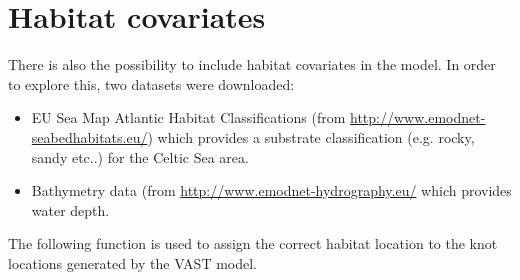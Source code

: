\documentclass[12pt]{article}\usepackage[]{graphicx}\usepackage[]{color}
\begin{document}
\section{Habitat covariates}

There is also the possibility to include habitat covariates in the model. In
order to explore this, two datasets were downloaded:

\begin{itemize}
	\item EU Sea Map Atlantic Habitat Classifications (from
		\url{http://www.emodnet-seabedhabitats.eu/}) which provides a
		substrate classification (e.g. rocky, sandy etc..) for the
		Celtic Sea area.
	\item Bathymetry data (from \url{http://www.emodnet-hydrography.eu/}
		which provides water depth.

\end{itemize}

The following function is used to assign the correct habitat location to the
knot locations generated by the VAST model. \\
\end{document}
